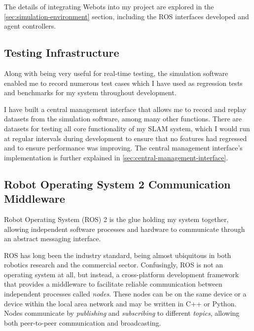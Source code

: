 The details of integrating Webots into my project are explored in the \autoref{sec:simulation-environment} section, including the ROS interfaces developed and agent controllers.

\subsection{Testing Infrastructure}
\label{sec:testing-infrastructure}

Along with being very useful for real-time testing, the simulation software enabled me to record numerous test cases which I have used as regression tests and benchmarks for my system throughout development.

I have built a central management interface that allows me to record and replay datasets from the simulation software, among many other functions. There are datasets for testing all core functionality of my SLAM system, which I would run at regular intervals during development to ensure that no features had regressed and to ensure performance was improving. The central management interface's implementation is further explained in \autoref{sec:central-management-interface}.

\subsection{Robot Operating System 2 Communication Middleware}
\label{sec:ros-2}
Robot Operating System (ROS) 2 is the glue holding my system together, allowing independent software processes and hardware to communicate through an abstract messaging interface.

ROS has long been the industry standard, being almost ubiquitous in both robotics research and the commercial sector. Confusingly, ROS is not an operating system at all, but instead, a cross-platform development framework that provides a middleware to facilitate reliable communication between independent processes called \textit{nodes}. These nodes can be on the same device or a device within the local area network and may be written in C++ or Python. Nodes communicate by \textit{publishing} and \textit{subscribing} to different \textit{topics}, allowing both peer-to-peer communication and broadcasting.


